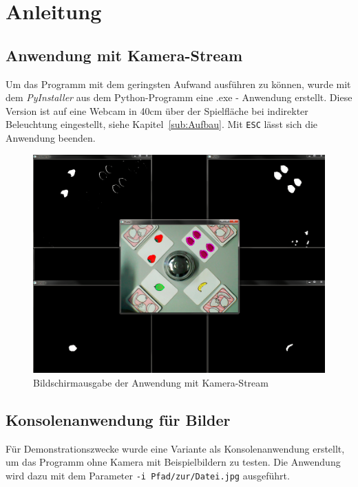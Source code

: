 
\section{Anleitung}
\label{sec:Anleitung}

\subsection{Anwendung mit Kamera-Stream}

Um das Programm mit dem geringsten Aufwand ausführen zu können, wurde mit dem \emph{PyInstaller} aus dem Python-Programm eine .exe - Anwendung erstellt. Diese Version ist auf eine Webcam in 40cm über der Spielfläche bei indirekter Beleuchtung eingestellt, siehe Kapitel~\ref{sub:Aufbau}.
Mit \lstinline{ESC} lässt sich die Anwendung beenden.
\begin{figure}[H]
    \centering
    \includegraphics[width=15cm]{Abbildungen/HalliGalli01}
    \caption[Aus]{Bildschirmausgabe der Anwendung mit Kamera-Stream}
    \label{fig:Ausgabe}
\end{figure}


\subsection{Konsolenanwendung für Bilder}
Für Demonstrationszwecke wurde eine Variante als Konsolenanwendung erstellt, um das Programm ohne Kamera mit Beispielbildern zu testen.
Die Anwendung wird dazu mit dem Parameter \lstinline{-i Pfad/zur/Datei.jpg} ausgeführt.

